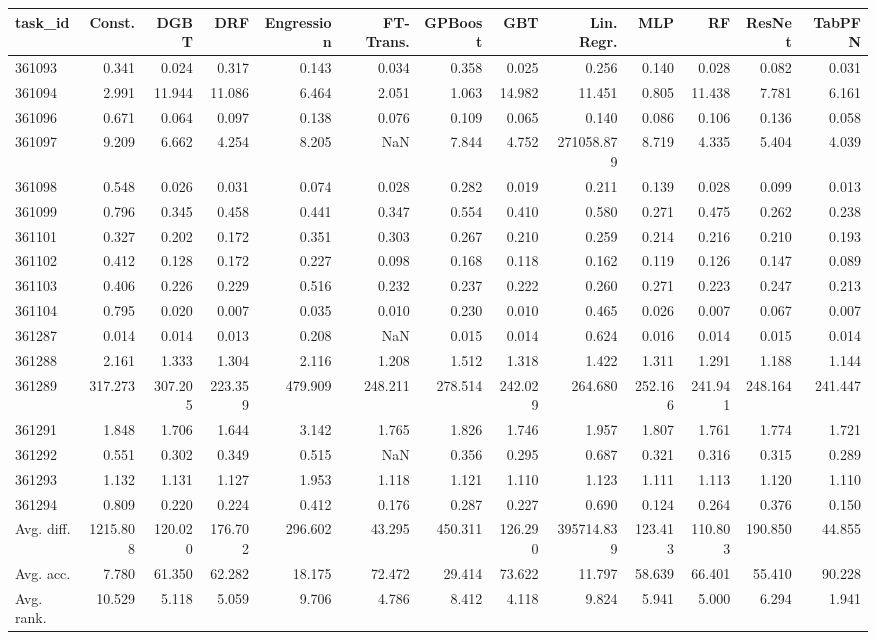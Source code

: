 \begin{tabular}{lrrrrrrrrrrrr}
\toprule
task\_id & Const. & DGBT & DRF & Engression & FT-Trans. & GPBoost & GBT & Lin. Regr. & MLP & RF & ResNet & TabPFN \\
\midrule
361093 & 0.341 & 0.024 & 0.317 & 0.143 & 0.034 & 0.358 & 0.025 & 0.256 & 0.140 & 0.028 & 0.082 & 0.031 \\
361094 & 2.991 & 11.944 & 11.086 & 6.464 & 2.051 & 1.063 & 14.982 & 11.451 & 0.805 & 11.438 & 7.781 & 6.161 \\
361096 & 0.671 & 0.064 & 0.097 & 0.138 & 0.076 & 0.109 & 0.065 & 0.140 & 0.086 & 0.106 & 0.136 & 0.058 \\
361097 & 9.209 & 6.662 & 4.254 & 8.205 & NaN & 7.844 & 4.752 & 271058.879 & 8.719 & 4.335 & 5.404 & 4.039 \\
361098 & 0.548 & 0.026 & 0.031 & 0.074 & 0.028 & 0.282 & 0.019 & 0.211 & 0.139 & 0.028 & 0.099 & 0.013 \\
361099 & 0.796 & 0.345 & 0.458 & 0.441 & 0.347 & 0.554 & 0.410 & 0.580 & 0.271 & 0.475 & 0.262 & 0.238 \\
361101 & 0.327 & 0.202 & 0.172 & 0.351 & 0.303 & 0.267 & 0.210 & 0.259 & 0.214 & 0.216 & 0.210 & 0.193 \\
361102 & 0.412 & 0.128 & 0.172 & 0.227 & 0.098 & 0.168 & 0.118 & 0.162 & 0.119 & 0.126 & 0.147 & 0.089 \\
361103 & 0.406 & 0.226 & 0.229 & 0.516 & 0.232 & 0.237 & 0.222 & 0.260 & 0.271 & 0.223 & 0.247 & 0.213 \\
361104 & 0.795 & 0.020 & 0.007 & 0.035 & 0.010 & 0.230 & 0.010 & 0.465 & 0.026 & 0.007 & 0.067 & 0.007 \\
361287 & 0.014 & 0.014 & 0.013 & 0.208 & NaN & 0.015 & 0.014 & 0.624 & 0.016 & 0.014 & 0.015 & 0.014 \\
361288 & 2.161 & 1.333 & 1.304 & 2.116 & 1.208 & 1.512 & 1.318 & 1.422 & 1.311 & 1.291 & 1.188 & 1.144 \\
361289 & 317.273 & 307.205 & 223.359 & 479.909 & 248.211 & 278.514 & 242.029 & 264.680 & 252.166 & 241.941 & 248.164 & 241.447 \\
361291 & 1.848 & 1.706 & 1.644 & 3.142 & 1.765 & 1.826 & 1.746 & 1.957 & 1.807 & 1.761 & 1.774 & 1.721 \\
361292 & 0.551 & 0.302 & 0.349 & 0.515 & NaN & 0.356 & 0.295 & 0.687 & 0.321 & 0.316 & 0.315 & 0.289 \\
361293 & 1.132 & 1.131 & 1.127 & 1.953 & 1.118 & 1.121 & 1.110 & 1.123 & 1.111 & 1.113 & 1.120 & 1.110 \\
361294 & 0.809 & 0.220 & 0.224 & 0.412 & 0.176 & 0.287 & 0.227 & 0.690 & 0.124 & 0.264 & 0.376 & 0.150 \\
Avg. diff. & 1215.808 & 120.020 & 176.702 & 296.602 & 43.295 & 450.311 & 126.290 & 395714.839 & 123.413 & 110.803 & 190.850 & 44.855 \\
Avg. acc. & 7.780 & 61.350 & 62.282 & 18.175 & 72.472 & 29.414 & 73.622 & 11.797 & 58.639 & 66.401 & 55.410 & 90.228 \\
Avg. rank. & 10.529 & 5.118 & 5.059 & 9.706 & 4.786 & 8.412 & 4.118 & 9.824 & 5.941 & 5.000 & 6.294 & 1.941 \\
\bottomrule
\end{tabular}
